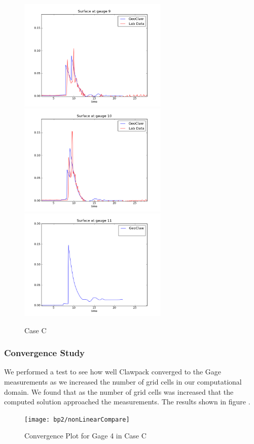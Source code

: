 \begin{figure}[ht]
\hfil\includegraphics[width=2.8in]{bp5/CaseC/gauge0009fig300.png}\hfil
\vskip 5pt
\hfil\includegraphics[width=2.8in]{bp5/CaseC/gauge0010fig300.png}\hfil
\hfil\includegraphics[width=2.8in]{bp5/CaseC/gauge0011fig300.png}\hfil
\caption{\label{fig:bp2C} Case C }
\end{figure}

\subsubsection{Convergence Study}
We performed a test to see how well Clawpack converged to the Gage measurements as we increased the number of grid cells in our computational domain.  We found that as the number of grid cells was increased that the computed solution approached the measurements.  The results shown in figure .

\begin{figure}[ht]
\hfil\texttt{[image: bp2/nonLinearCompare]}\hfil
\caption{\label{fig:nonLinearConverge} Convergence Plot for Gage 4 in Case C }
\end{figure}

